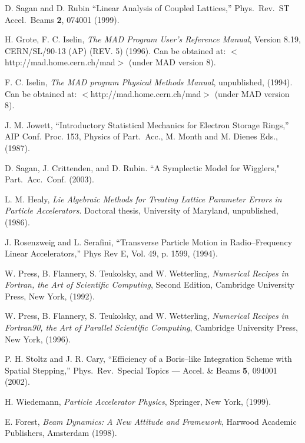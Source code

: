 \begin{thebibliography}{99}

D. Sagan and D. Rubin ``Linear Analysis of Coupled Lattices,''
Phys.\ Rev.\ ST Accel.\ Beams {\bf 2}, 074001 (1999).

H. Grote, F. C. Iselin, {\it The MAD Program User's Reference Manual},
Version 8.19, CERN/SL/90-13 (AP) (REV. 5) (1996). Can be obtained at:
$<$http://mad.home.cern.ch/mad$>$ (under MAD version 8).

F. C. Iselin, {\it The MAD program Physical Methods Manual}, 
unpublished, (1994).  Can be obtained at: $<$http://mad.home.cern.ch/mad$>$
(under MAD version 8).

J. M. Jowett, ``Introductory Statistical Mechanics
for Electron Storage Rings,'' AIP Conf. Proc. 153, Physics of Part.\ Acc.,
M. Month and M. Dienes Eds., (1987).

D. Sagan, J. Crittenden, and D. Rubin.
``A Symplectic Model for Wigglers," Part.\ Acc.\ Conf. (2003).

L. M. Healy, {\it Lie Algebraic Methods for Treating Lattice Parameter
Errors in Particle Accelerators}. Doctoral thesis, University of
Maryland, unpublished, (1986).

J. Rosenzweig and L. Serafini, ``Transverse Particle Motion in
Radio--Frequency Linear Accelerators,'' Phys Rev E, Vol. 49, p. 1599,
(1994).

W. Press, B. Flannery, S. Teukolsky, and W. Wetterling, {\em Numerical
Recipes in Fortran, the Art of Scientific Computing}, Second Edition,
Cambridge University Press, New York, (1992).

W. Press, B. Flannery, S. Teukolsky, and W. Wetterling, {\em Numerical
Recipes in Fortran90, the Art of Parallel Scientific Computing}, 
Cambridge University Press, New York, (1996).


P. H. Stoltz and J. R. Cary, ``Efficiency of a Boris--like Integration
Scheme with Spatial Stepping,'' Phys.\ Rev.\ Special Topics ---
Accel. \& Beams {\bf 5}, 094001 (2002).

H. Wiedemann, {\em Particle Accelerator Physics}, Springer, New York, (1999). 

E. Forest, {\em Beam Dynamics: A New Attitude and Framework},
Harwood Academic Publishers, Amsterdam (1998).

\end{thebibliography}

